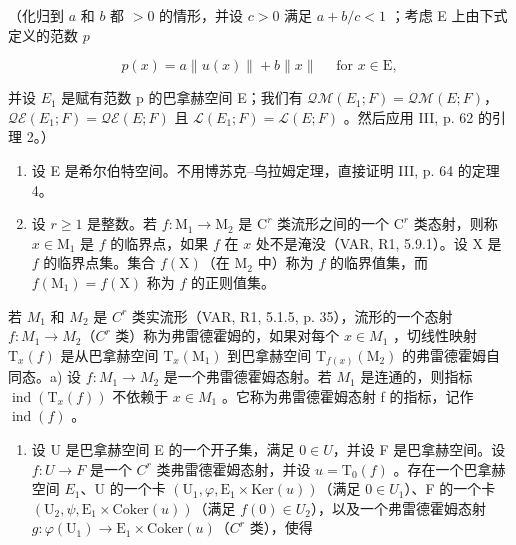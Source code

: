 （化归到 \(a\) 和 \(b\) 都 \(>0\) 的情形，并设 \(c > 0\) 满足 \(a + b/c < 1\) ；考虑 E 上由下式定义的范数 \(p\)

\[
p (x) = a \| u (x) \| + b \| x \| \quad \text {   for   } x \in \mathrm{E},
\]

并设 \(E_{1}\) 是赋有范数 p 的巴拿赫空间 E；我们有 \(\mathcal{Q}\mathcal{M}(E_{1};F)=\mathcal{Q}\mathcal{M}(E;F)\)，\(\mathcal{Q}\mathcal{E}(E_{1};F)=\mathcal{Q}\mathcal{E}(E;F)\) 且 \(\mathcal{L}(E_{1};F)=\mathcal{L}(E;F)\) 。然后应用 III, p. 62 的引理 2。）

\begin{enumerate}
\def\labelenumi{\arabic{enumi})}
\setcounter{enumi}{7}
\item
  设 E 是希尔伯特空间。不用博苏克–乌拉姆定理，直接证明 III, p. 64 的定理 4。
\item
  设 \(r \geqslant 1\) 是整数。若 \(f: \mathrm{M}_1 \to \mathrm{M}_2\) 是 \(\mathrm{C}^r\) 类流形之间的一个 \(\mathrm{C}^r\) 类态射，则称 \(x \in \mathrm{M}_1\) 是 \(f\) 的临界点，如果 \(f\) 在 \(x\) 处不是淹没（VAR, R1, 5.9.1）。设 X 是 \(f\) 的临界点集。集合 \(f(\mathrm{X})\)（在 \(\mathrm{M}_2\) 中）称为 \(f\) 的临界值集，而 \(f(\mathrm{M}_1) = f(\mathrm{X})\) 称为 \(f\) 的正则值集。
\end{enumerate}

若 \(M_{1}\) 和 \(M_{2}\) 是 \(C^{r}\) 类实流形（VAR, R1, 5.1.5, p. 35），流形的一个态射 \(f: M_{1} \to M_{2}\)（\(C^{r}\) 类）称为弗雷德霍姆的，如果对每个 \(x \in M_{1}\) ，切线性映射 \(\mathrm{T}_{x}(f)\) 是从巴拿赫空间 \(\mathrm{T}_{x}(\mathrm{M}_{1})\) 到巴拿赫空间 \(\mathrm{T}_{f(x)}(\mathrm{M}_{2})\) 的弗雷德霍姆自同态。a) 设 \(f: M_{1} \to M_{2}\) 是一个弗雷德霍姆态射。若 \(M_{1}\) 是连通的，则指标 \(\operatorname{ind}(\mathrm{T}_{x}(f))\) 不依赖于 \(x \in M_{1}\) 。它称为弗雷德霍姆态射 f 的指标，记作 \(\operatorname{ind}(f)\) 。

\begin{enumerate}
\def\labelenumi{\alph{enumi})}
\setcounter{enumi}{1}
\tightlist
\item
  设 U 是巴拿赫空间 E 的一个开子集，满足 \(0 \in U\)，并设 F 是巴拿赫空间。设 \(f: U \to F\) 是一个 \(C^{r}\) 类弗雷德霍姆态射，并设 \(u = \mathrm{T}_{0}(f)\) 。存在一个巴拿赫空间 \(E_{1}\)、U 的一个卡 \((\mathrm{U}_{1}, \varphi, \mathrm{E}_{1} \times \mathrm{Ker}(u))\)（满足 \(0 \in U_{1}\)）、F 的一个卡 \((\mathrm{U}_{2}, \psi, \mathrm{E}_{1} \times \mathrm{Coker}(u))\)（满足 \(f(0) \in U_{2}\)），以及一个弗雷德霍姆态射 \(g: \varphi(\mathrm{U}_{1}) \to \mathrm{E}_{1} \times \mathrm{Coker}(u)\)（\(C^{r}\) 类），使得
\end{enumerate}

